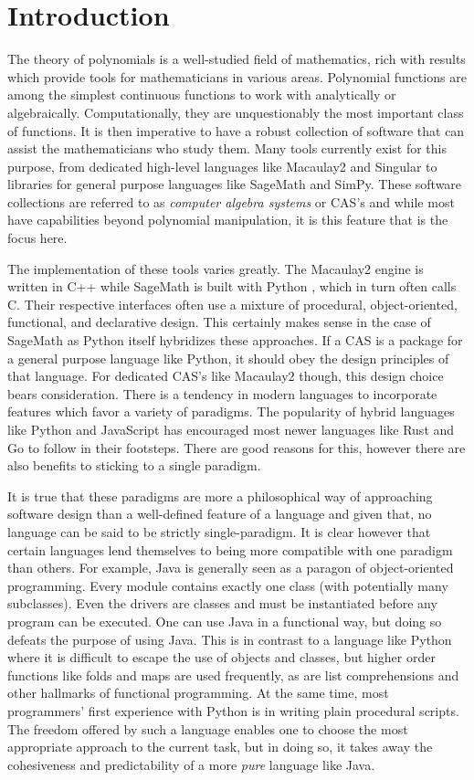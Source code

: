 \documentclass[MS, xcolor=dvipsnames]{wfuthesis}
\theoremstyle{definition}
\begin{document}
\chapter{Introduction}
The theory of polynomials is a well-studied field of mathematics, rich with results which provide tools for mathematicians in various areas. Polynomial functions are among the simplest continuous functions to work with analytically or algebraically. Computationally, they are unquestionably the most important class of functions. It is then imperative to have a robust collection of software that can assist the mathematicians who study them. Many tools currently exist for this purpose, from dedicated high-level languages like Macaulay2 and Singular to libraries for general purpose languages like SageMath and SimPy. These software collections are referred to as \textit{computer algebra systems} or CAS's and while most have capabilities beyond polynomial manipulation, it is this feature that is the focus here. \par 
The implementation of these tools varies greatly. The Macaulay2 engine is written in C++ \cite{M2} while SageMath is built with Python \cite{SageMath}, which in turn often calls C. Their respective interfaces often use a mixture of procedural, object-oriented, functional, and declarative design. This certainly makes sense in the case of SageMath as Python itself hybridizes these approaches. If a CAS is a package for a general purpose language like Python, it should obey the design principles of that language. For dedicated CAS's like Macaulay2 though, this design choice bears consideration. There is a tendency in modern languages to incorporate features which favor a variety of paradigms. The popularity of hybrid languages like Python and JavaScript has encouraged most newer languages like Rust and Go to follow in their footsteps. There are good reasons for this, however there are also benefits to sticking to a single paradigm. \par 
It is true that these paradigms are more a philosophical way of approaching software design than a well-defined feature of a language and given that, no language can be said to be strictly single-paradigm. It is clear however that certain languages lend themselves to being more compatible with one paradigm than others. For example, Java is generally seen as a paragon of object-oriented programming. Every module contains exactly one class (with potentially many subclasses). Even the drivers are classes and must be instantiated before any program can be executed. One can use Java in a functional way, but doing so defeats the purpose of using Java. This is in contrast to a language like Python where it is difficult to escape the use of objects and classes, but higher order functions like folds and maps are used frequently, as are list comprehensions and other hallmarks of functional programming. At the same time, most programmers' first experience with Python is in writing plain procedural scripts. The freedom offered by such a language enables one to choose the most appropriate approach to the current task, but in doing so, it takes away the cohesiveness and predictability of a more \textit{pure} language like Java. \par 
\end{document}
